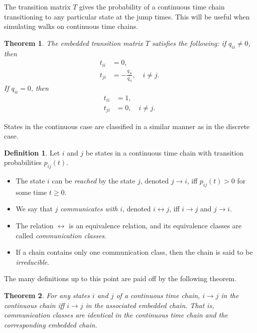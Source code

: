 \documentclass[12pt]{article}
\newtheorem{thm}{Theorem}[section]
\theoremstyle{definition}
\newtheorem{defn}{Definition}
\begin{document}
The transition matrix $T$ gives the probability of a continuous time chain
transitioning to any particular state at the jump times. This will be useful
when simulating walks on continuous time chains.

\begin{thm}
    \label{thm:embedded-transition-matrix}
    The embedded transition matrix $T$ satisfies the following: if $q_{ii} \neq
    0$, then
    \begin{align*}
        t_{ii} &= 0, \\
        t_{ji} &= -\frac{q_{ji}}{q_{ii}}, \quad i \neq j.
    \end{align*}
    If $q_{ii} = 0$, then
    \begin{align*}
        t_{ii} &= 1, \\
        t_{ji} &= 0, \quad i \neq j.
    \end{align*}
\end{thm}

States in the continuous case are classified in a similar manner as in the
discrete case.

\begin{defn}
    \label{defn:continuous-classes}
    Let $i$ and $j$ be states in a continuous time chain with transition
    probabilities $p_{ij}(t)$.
    \begin{itemize}
        \item The state $i$ can be \emph{reached} by the state $j$, denoted $j
        \to i$, iff $p_{ij}(t) > 0$ for some time $t \geq 0$.

        \item We say that $j$ \emph{communicates with} $i$, denoted $i
        \leftrightarrow j$, iff $i \to j$ and $j \to i$.

        \item The relation $\leftrightarrow$ is an equivalence relation, and
        its equivalence classes are called \emph{communication classes}. 

        \item If a chain contains only one communication class, then the chain
        is said to be \emph{irreducible}. 
    \end{itemize}
\end{defn}

The many definitions up to this point are paid off by the following theorem.

\begin{thm}
    \label{thm:embedded-behavior}
    For any states $i$ and $j$ of a continuous time chain, $i \to j$ in the
    continuous chain iff $i \to j$ in the associated embedded chain. That is,
    communication classes are identical in the continuous time chain and the
    corresponding embedded chain.
\end{thm}
\end{document}
